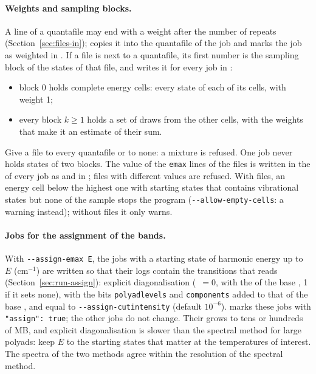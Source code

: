 \paragraph{Weights and sampling blocks.} A line of a quantafile may end
with a weight after the number of repeats (Section~\ref{sec:files-in});
 copies it into the quantafile of the job and marks
the job as weighted in . If a file
 is next to a quantafile, its first number is the
sampling block of the states of that file, and 
writes it for every job in :
\begin{itemize}
\item block 0 holds complete energy cells: every state of each of its
  cells, with weight 1;
\item every block $k \ge 1$ holds a set of draws from the other cells,
  with the weights that make it an estimate of their sum.
\end{itemize}
Give a  file to every quantafile or to none: a mixture is
refused. One job never holds states of two blocks. The value of the
\texttt{emax} lines of the  files is written in the
 of every job as  and in ;
files with different values are refused. With  files, an
energy cell below the highest one with starting states that contains
vibrational states but none of the sample stops the program
(\texttt{-{}-allow-empty-cells}: a warning instead); without
 files it only warns.

\paragraph{Jobs for the assignment of the bands.} With
\texttt{-{}-assign-emax E}, the jobs with a starting state of harmonic
energy up to $E$ (cm$^{-1}$) are written so that their logs contain the
transitions that  reads
(Section~\ref{sec:run-assign}): explicit diagonalisation
(~$=0$, with the  of the base ,
1 if it sets none),  with the bits \texttt{polyadlevels}
and \texttt{components} added to that of the base , and
 equal to \texttt{-{}-assign-cutintensity} (default
$10^{-6}$).  marks these jobs with
\texttt{"assign": true}; the other jobs do not change. Their
 grows to tens or hundreds of MB, and explicit
diagonalisation is slower than the spectral method for large polyads:
keep $E$ to the starting states that matter at the temperatures of
interest. The spectra of the two methods agree within the resolution of
the spectral method.

